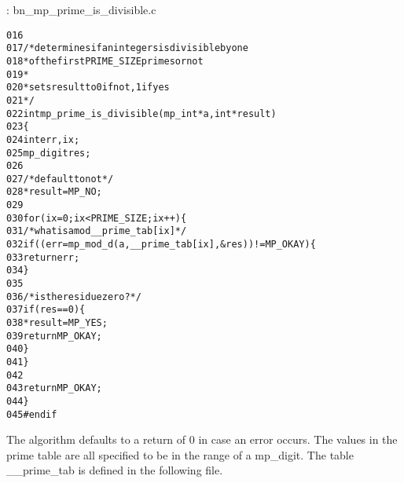\documentclass[b5paper]{book}
\begin{document}
\vspace{+3mm}\begin{small}
\hspace{-5.1mm}{\bf File}: bn\_mp\_prime\_is\_divisible.c
\vspace{-3mm}
\begin{alltt}
016   
017   /* determines if an integers is divisible by one 
018    * of the first PRIME_SIZE primes or not
019    *
020    * sets result to 0 if not, 1 if yes
021    */
022   int mp_prime_is_divisible (mp_int * a, int *result)
023   \{
024     int     err, ix;
025     mp_digit res;
026   
027     /* default to not */
028     *result = MP_NO;
029   
030     for (ix = 0; ix < PRIME_SIZE; ix++) \{
031       /* what is a mod __prime_tab[ix] */
032       if ((err = mp_mod_d (a, __prime_tab[ix], &res)) != MP_OKAY) \{
033         return err;
034       \}
035   
036       /* is the residue zero? */
037       if (res == 0) \{
038         *result = MP_YES;
039         return MP_OKAY;
040       \}
041     \}
042   
043     return MP_OKAY;
044   \}
045   #endif
\end{alltt}
\end{small}

The algorithm defaults to a return of $0$ in case an error occurs.  The values in the prime table are all specified to be in the range of a 
mp\_digit.  The table \_\_prime\_tab is defined in the following file.
\end{document}
